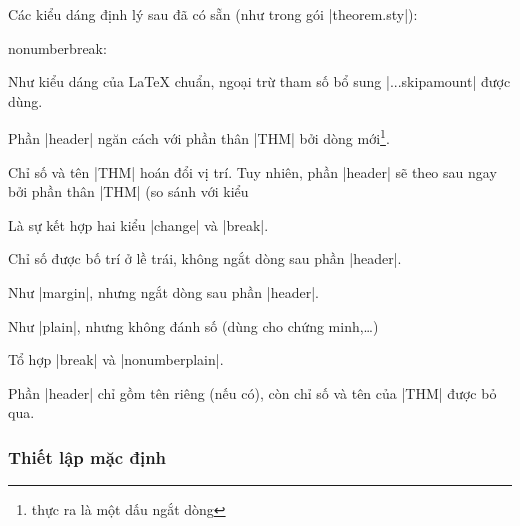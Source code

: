 \documentclass[11pt,oneside]{ltxdoc}
\theoremstyle{marginbreak}
\theoremstyle{changebreak}
\theoremstyle{change}
\theoremstyle{plain}
\theoremstyle{nonumberplain}
\begin{document}
Các kiểu dáng định lý sau đã có sẵn (như trong gói |theorem.sty|):
\begin{deflist}{nonumberbreak:}
   \item[plain]
		Như kiểu dáng của \LaTeX{} chuẩn,
		ngoại trừ tham số bổ sung |\theorem...skipamount|  được dùng.
   \item[break]
		Phần |header| ngăn cách với phần thân |THM| bởi dòng mới\footnote{thực ra là một dấu ngắt dòng}.
   \item[change]
		Chỉ số và tên |THM| hoán đổi vị trí. Tuy nhiên, phần
		|header| sẽ theo sau ngay bởi phần thân |THM| (so sánh với kiểu
   \item[changebreak]
		Là sự kết hợp hai kiểu |change| và |break|.
   \item[margin]
		Chỉ số được bố trí ở lề trái, không ngắt dòng sau phần |header|.
   \item[marginbreak]
		Như |margin|, nhưng ngắt dòng sau phần |header|.
   \item[nonumberplain]
		Như |plain|, nhưng không đánh số (dùng cho chứng minh,\ldots)
   \item[nonumberbreak]
		Tổ hợp |break| và |nonumberplain|.
   \item[empty]
		Phần |header| chỉ gồm tên riêng (nếu có), còn chỉ số và tên của
		|THM| được bỏ qua.
\end{deflist}

\subsubsection{Thiết lập mặc định}
\end{document}
